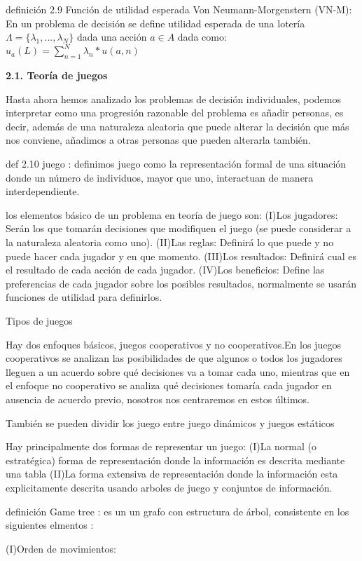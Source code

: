 \documentclass[11pt, a4paper]{article} %
\begin{document}
definición 2.9 Función de utilidad esperada Von Neumann-Morgenstern (VN-M):
En un problema de decisión se define utilidad esperada de una lotería $ \Lambda =\{ \lambda_1,...,\lambda_N\} $ dada una acción $a \in A$ dada  como:
$u_a(L)=\sum_{n=1}^{N}\lambda_n*u(a,n)$


{\bfseries \large 2.1. Teoría de juegos} \vspace{10mm}

Hasta ahora hemos analizado los problemas de decisión individuales, podemos interpretar como una progresión razonable del problema es añadir personas, es decir, además de una naturaleza aleatoria que puede alterar la decisión que más nos conviene, añadimos a otras personas que pueden alterarla también.

def 2.10 juego :
definimos juego como la representación formal de una situación donde un número de individuos, mayor que uno, interactuan de manera interdependiente.

los elementos básico de un problema en teoría de juego son:
(I)Los jugadores: Serán los que tomarán decisiones que modifiquen el juego (se puede considerar a la naturaleza aleatoria como uno).
(II)Las reglas: Definirá lo que puede y no puede hacer cada jugador y en que momento.
(III)Los resultados: Definirá cual es el resultado de cada acción de cada jugador.
(IV)Los beneficios: Define las preferencias de cada jugador sobre los posibles resultados, normalmente se usarán funciones de utilidad para definirlos.



Tipos de juegos

Hay dos enfoques básicos, juegos cooperativos y no cooperativos.En los juegos cooperativos se analizan las posibilidades de que algunos o todos los jugadores lleguen a un acuerdo sobre qué decisiones va a tomar cada uno, mientras que en el enfoque no cooperativo se analiza qué decisiones tomaría cada jugador en ausencia de acuerdo previo, nosotros nos centraremos en estos últimos.

También se pueden dividir los juego entre juego dinámicos y juegos estáticos

Hay principalmente dos formas de representar un juego:
(I)La normal (o estratégica) forma de representación donde la información es descrita mediante una tabla
(II)La forma extensiva de representación donde la información esta explicitamente descrita usando arboles de juego y conjuntos de información.

definición Game tree :
es un un grafo con estructura de árbol, consistente en los siguientes elmentos :

(I)Orden de movimientos:









\newpage

\end{document}
